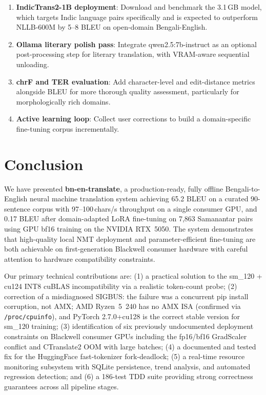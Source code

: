 \documentclass[conference]{IEEEtran}
\newcommand{\POSTFTBLEU}{0.17}
\begin{document}
\begin{enumerate}
  \item \textbf{IndicTrans2-1B deployment}: Download and benchmark the 3.1\,GB model,
        which targets Indic language pairs specifically and is expected to
        outperform NLLB-600M by 5--8 BLEU on open-domain Bengali-English.

  \item \textbf{Ollama literary polish pass}: Integrate qwen2.5:7b-instruct as an
        optional post-processing step for literary translation, with VRAM-aware
        sequential unloading.

  \item \textbf{chrF and TER evaluation}: Add character-level and edit-distance
        metrics alongside BLEU for more thorough quality assessment,
        particularly for morphologically rich domains.

  \item \textbf{Active learning loop}: Collect user corrections to build a
        domain-specific fine-tuning corpus incrementally.
\end{enumerate}

\section{Conclusion}

We have presented \textbf{bn-en-translate}, a production-ready, fully offline
Bengali-to-English neural machine translation system achieving 65.2 BLEU on a
curated 90-sentence corpus with 97--100\,chars/s throughput on a single consumer GPU,
and \POSTFTBLEU{} BLEU after domain-adapted LoRA fine-tuning on 7,863 Samanantar
pairs using GPU bf16 training on the NVIDIA RTX~5050.
The system demonstrates that high-quality local NMT deployment and parameter-efficient
fine-tuning are both achievable on first-generation Blackwell consumer hardware with
careful attention to hardware compatibility constraints.

Our primary technical contributions are: (1) a practical solution to the
sm\_120 + cu124 INT8 cuBLAS incompatibility via a realistic token-count probe;
(2) correction of a misdiagnosed SIGBUS: the failure was a concurrent pip install
corruption, not AMX; AMD Ryzen~5~240 has no AMX ISA (confirmed via \texttt{/proc/cpuinfo}),
and PyTorch 2.7.0+cu128 is the correct stable version for sm\_120 training;
(3) identification of six previously undocumented deployment constraints on
Blackwell consumer GPUs including the fp16/bf16 GradScaler conflict and
CTranslate2 OOM with large batches;
(4) a documented and tested fix for the HuggingFace fast-tokenizer fork-deadlock;
(5) a real-time resource monitoring subsystem with SQLite persistence, trend
analysis, and automated regression detection; and
(6) a 186-test TDD suite providing strong correctness guarantees across all
pipeline stages.
\end{document}
